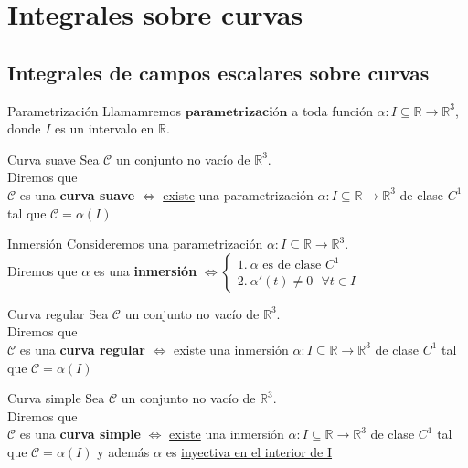 \documentclass{report}
\newcommand\reals{\mathds{R}}
\begin{document}
\chapter{Integrales sobre curvas}
\section{Integrales de campos escalares sobre curvas}
\begin{defbox}{Parametrización}
	Llamamremos $\textbf{parametrización}$ a toda función \(\alpha : I\subseteq\reals\rightarrow\reals^3\), donde \(I\) es un intervalo en \(\reals\).
\end{defbox}

\begin{defbox}{Curva suave}
	Sea \(\mathcal{C}\) un conjunto no vacío de \(\reals^3\). \\
	Diremos que \\
	$\mathcal{C}$ es una \textbf{curva suave} $\iff$ \underline{existe} una parametrización $\alpha : I\subseteq\reals\rightarrow\reals^3$ de clase $C^1$ tal que $\mathcal{C}=\alpha (I)$
\end{defbox}

\begin{defbox}{Inmersión}
	Consideremos una parametrización $\alpha : I \subseteq \reals \rightarrow \reals^3$. \\

	Diremos que $\alpha$ es una \textbf{inmersión} \(\iff
	\left\{ \begin{array}{l}
		1. ~\alpha \text{ es de clase }C^1 \\
		2. ~\alpha '(t) \ne 0 ~~~ \forall t \in I
	\end{array}\right.\)
\end{defbox}

\begin{defbox}{Curva regular}
	Sea \(\mathcal{C}\) un conjunto no vacío de \(\reals^3\). \\
	Diremos que \\
	$\mathcal{C}$ es una \textbf{curva regular} $\iff$ \underline{existe} una inmersión $\alpha : I\subseteq\reals\rightarrow\reals^3$ de clase $C^1$ tal que $\mathcal{C}=\alpha (I)$
\end{defbox}

\begin{defbox}{Curva simple}
	Sea \(\mathcal{C}\) un conjunto no vacío de \(\reals^3\). \\
	Diremos que \\
	$\mathcal{C}$ es una \textbf{curva simple} $\iff$ \underline{existe} una inmersión $\alpha : I\subseteq\reals\rightarrow\reals^3$ de clase $C^1$ tal que $\mathcal{C}=\alpha (I)$ y además $\alpha$ es \underline{inyectiva en el interior de I}
\end{defbox}
\end{document}
